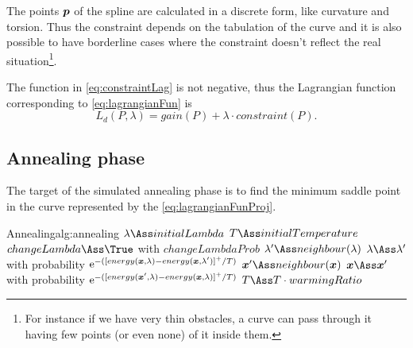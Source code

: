 \documentclass[dissertation.tex]{subfiles}
\begin{document}
The points $\boldsymbol{p}$ of the spline are calculated in a discrete
form, like curvature and torsion. Thus the constraint depends on the
tabulation of the curve and
it is also possible to have borderline cases where the
constraint doesn't reflect the real situation\footnote{For instance if
  we have very thin obstacles, a curve can pass through it having few
  points (or even none) of it inside them.}.

The
function in \cref{eq:constraintLag} is not negative, thus the
Lagrangian function corresponding to 
\cref{eq:lagrangianFun} is
\begin{equation}\label{eq:lagrangianFunProj}
    L_d(P,\lambda)=gain(P)+\lambda\cdot constraint(P).
\end{equation}

\subsection{Annealing phase}
The target of the simulated annealing phase is to find the minimum
saddle point in
the curve represented by the
\cref{eq:lagrangianFunProj}.
\begin{algo}{Annealing}{alg:annealing}
  \State $\lambda\Ass initialLambda$\label{alg:annealing:initialize}
  \State $T\Ass initialTemperature$\label{alg:annealing:initialize2}
  \label{alg:annealing:while}
  \label{alg:annealing:for}
  \State $changeLambda\Ass\True$ with $changeLambdaProb$\label{alg:annealing:lambdaProb}
  \State $\lambda'\Ass neighbour(\lambda)$\label{alg:annealing:changeLambda}
  \State $\lambda\Ass \lambda'$ with probability $\mathrm{e}^{-([energy(\boldsymbol{x},\lambda)-energy(\boldsymbol{x},\lambda')]^+/T)}$
  \Else
  \State $\ve{x}'\Ass neighbour(\ve{x})$\label{alg:annealing:changeX}
  \State $\ve{x}\Ass \ve{x}'$ with probability $\mathrm{e}^{-([energy(\boldsymbol{x}',\lambda)-energy(\boldsymbol{x},\lambda)]^+/T)}$
  \EndIf
  \EndFor
  \State $T\Ass T\cdot warmingRatio$\label{alg:annealing:cooling}
  \EndWhile
  \EndProcedure
\end{algo}
\end{document}
